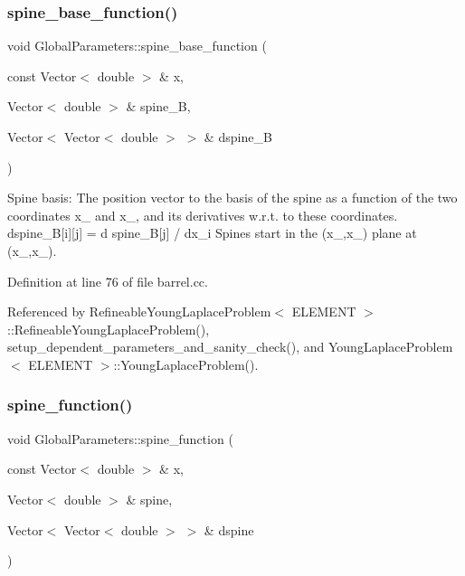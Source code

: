 \subsubsection{\texorpdfstring{spine\+\_\+base\+\_\+function()}{spine\_base\_function()}}
{\footnotesize\ttfamily void Global\+Parameters\+::spine\+\_\+base\+\_\+function (\begin{DoxyParamCaption}\item[{const Vector$<$ double $>$ \&}]{x,  }\item[{Vector$<$ double $>$ \&}]{spine\+\_\+B,  }\item[{Vector$<$ Vector$<$ double $>$ $>$ \&}]{dspine\+\_\+B }\end{DoxyParamCaption})}



Spine basis\+: The position vector to the basis of the spine as a function of the two coordinates x\+\_ and x\+\_, and its derivatives w.\+r.\+t. to these coordinates. dspine\+\_\+B\mbox{[}i\mbox{]}\mbox{[}j\mbox{]} = d spine\+\_\+B\mbox{[}j\mbox{]} / dx\+\_\+i Spines start in the (x\+\_,x\+\_) plane at (x\+\_,x\+\_). 



Definition at line 76 of file barrel.\+cc.



Referenced by Refineable\+Young\+Laplace\+Problem$<$ E\+L\+E\+M\+E\+N\+T $>$\+::\+Refineable\+Young\+Laplace\+Problem(), setup\+\_\+dependent\+\_\+parameters\+\_\+and\+\_\+sanity\+\_\+check(), and Young\+Laplace\+Problem$<$ E\+L\+E\+M\+E\+N\+T $>$\+::\+Young\+Laplace\+Problem().

\mbox{\label{namespaceGlobalParameters_a82df8c67f58e78a236fb6a0cc8bf8284}} 
\subsubsection{\texorpdfstring{spine\+\_\+function()}{spine\_function()}}
{\footnotesize\ttfamily void Global\+Parameters\+::spine\+\_\+function (\begin{DoxyParamCaption}\item[{const Vector$<$ double $>$ \&}]{x,  }\item[{Vector$<$ double $>$ \&}]{spine,  }\item[{Vector$<$ Vector$<$ double $>$ $>$ \&}]{dspine }\end{DoxyParamCaption})}




